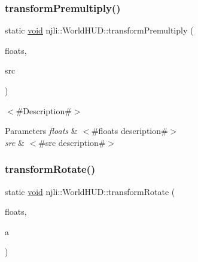 \subsubsection{\texorpdfstring{transform\+Premultiply()}{transformPremultiply()}\hspace{0.1cm}{\footnotesize\ttfamily [2/2]}}
{\footnotesize\ttfamily static \mbox{\hyperlink{_thread_8h_af1e856da2e658414cb2456cb6f7ebc66}{void}} njli\+::\+World\+H\+U\+D\+::transform\+Premultiply (\begin{DoxyParamCaption}\item[{\mbox{\hyperlink{_util_8h_a5f6906312a689f27d70e9d086649d3fd}{f32}} $\ast$}]{floats,  }\item[{\mbox{\hyperlink{_util_8h_a5f6906312a689f27d70e9d086649d3fd}{f32}} $\ast$}]{src }\end{DoxyParamCaption})\hspace{0.3cm}{\ttfamily [static]}}

$<$\#\+Description\#$>$


\begin{DoxyParams}{Parameters}
{\em floats} & $<$\#floats description\#$>$ \\
\hline
{\em src} & $<$\#src description\#$>$ \\
\hline
\end{DoxyParams}
\mbox{\label{classnjli_1_1_world_h_u_d_a1bbc160b9aeb8c7706993f8656fe1d13}} 
\subsubsection{\texorpdfstring{transform\+Rotate()}{transformRotate()}\hspace{0.1cm}{\footnotesize\ttfamily [1/2]}}
{\footnotesize\ttfamily static \mbox{\hyperlink{_thread_8h_af1e856da2e658414cb2456cb6f7ebc66}{void}} njli\+::\+World\+H\+U\+D\+::transform\+Rotate (\begin{DoxyParamCaption}\item[{bt\+Matrix3x3 \&}]{floats,  }\item[{\mbox{\hyperlink{_util_8h_a5f6906312a689f27d70e9d086649d3fd}{f32}}}]{a }\end{DoxyParamCaption})\hspace{0.3cm}{\ttfamily [static]}}

